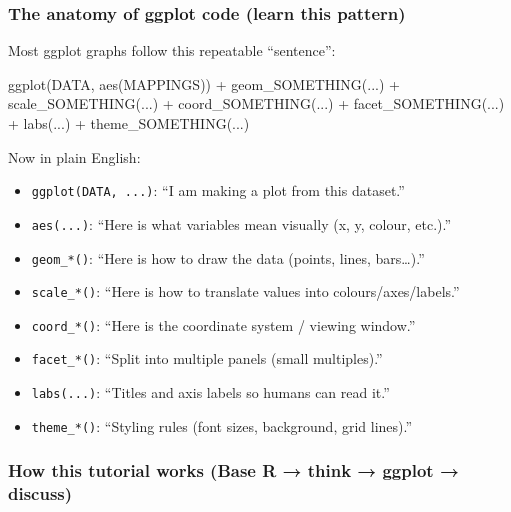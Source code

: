 \documentclass[
  letterpaper,
  DIV=11,
  numbers=noendperiod]{scrartcl}
\newenvironment{Shaded}{\begin{snugshade}}{\end{snugshade}}
\newcommand{\FunctionTok}[1]{\textcolor[rgb]{0.28,0.35,0.67}{#1}}
\newcommand{\NormalTok}[1]{\textcolor[rgb]{0.00,0.23,0.31}{#1}}
\newcommand{\SpecialCharTok}[1]{\textcolor[rgb]{0.37,0.37,0.37}{#1}}
\providecommand{\tightlist}{%
  \setlength{\itemsep}{0pt}\setlength{\parskip}{0pt}}\usepackage{longtable,booktabs,array}
\begin{document}
\subsubsection{The anatomy of ggplot code (learn this
pattern)}\label{the-anatomy-of-ggplot-code-learn-this-pattern}

Most ggplot graphs follow this repeatable ``sentence'':

\begin{Shaded}
\begin{Highlighting}[]
\FunctionTok{ggplot}\NormalTok{(DATA, }\FunctionTok{aes}\NormalTok{(MAPPINGS)) }\SpecialCharTok{+}
  \FunctionTok{geom\_SOMETHING}\NormalTok{(...) }\SpecialCharTok{+}
  \FunctionTok{scale\_SOMETHING}\NormalTok{(...) }\SpecialCharTok{+}
  \FunctionTok{coord\_SOMETHING}\NormalTok{(...) }\SpecialCharTok{+}
  \FunctionTok{facet\_SOMETHING}\NormalTok{(...) }\SpecialCharTok{+}
  \FunctionTok{labs}\NormalTok{(...) }\SpecialCharTok{+}
  \FunctionTok{theme\_SOMETHING}\NormalTok{(...)}
\end{Highlighting}
\end{Shaded}

Now in plain English:

\begin{itemize}
\tightlist
\item
  \texttt{ggplot(DATA,\ ...)}: ``I am making a plot from this dataset.''
\item
  \texttt{aes(...)}: ``Here is what variables mean visually (x, y,
  colour, etc.).''
\item
  \texttt{geom\_*()}: ``Here is how to draw the data (points, lines,
  bars\ldots).''
\item
  \texttt{scale\_*()}: ``Here is how to translate values into
  colours/axes/labels.''
\item
  \texttt{coord\_*()}: ``Here is the coordinate system / viewing
  window.''
\item
  \texttt{facet\_*()}: ``Split into multiple panels (small multiples).''
\item
  \texttt{labs(...)}: ``Titles and axis labels so humans can read it.''
\item
  \texttt{theme\_*()}: ``Styling rules (font sizes, background, grid
  lines).''
\end{itemize}

\subsubsection{How this tutorial works (Base R → think → ggplot →
discuss)}\label{how-this-tutorial-works-base-r-think-ggplot-discuss}
\end{document}
